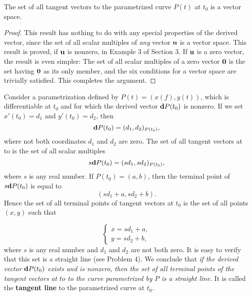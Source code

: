 

\begin{theorem} The set of all tangent vectors to the parametrized curve $P(t)$ at $t_0$ is a vector space.
\end{theorem}

\begin{proof}
This result has nothing to do with any special properties of the derived vector, since the set of all scalar multiples of \textit{any} vector $\mbox{\bf{u}}$ is a vector space. This result is proved, if $\mbox{\bf{u}}$ is nonzero, in Example 3 of Section 3. If $\mbox{\bf{u}}$ is a zero vector, the result is even simpler: The set of all scalar multiples of a zero vector $\mbox{\bf{0}}$ is the set having $\mbox{\bf{0}}$ as its only member, and the six conditions for a vector space are trivially satisfied. This completes the argument.
\end{proof}

Consider a parametrization defined by $P(t)= (x(f), y(t))$, which is differentiable at $t_0$ and for which the derived vector $\mbox{\bf{d}}P(t_0)$ is nonzero. If we set $x'(t_0) = d_1$ and $y'(t_0) = d_2$, then 
$$
\mbox{\bf{d}}P(t_0) = (d_1, d_2)_{P(t_0)},
$$
where not both coordinates $d_1$ and $d_2$ are zero. The set of all tangent vectors at to is the set of all scalar multiples 
$$
s\mbox{\bf{d}}P(t_0) = (sd_1, sd_2)_{P(t_0)},
$$
where $s$ is any real number. If $P(t_0) = (a, b)$, then the terminal point of $s\mbox{\bf{d}}P(t_0)$ is equal to
$$
(sd_1 + a, sd_2 + b).
$$
Hence the set of all terminal points of tangent vectors at $t_0$ is the set of all points $(x, y)$ such that 

\begin{equation}
\left \{ \begin{array}{l}
x = sd_1 + a,\\
y = sd_2 + b,
\end{array}
\right .
\label{eq10.4.4}
\end{equation}
where $s$ is any real number and $d_1$ and $d_2$ are not both zero. It is easy to verify that this set is a straight line (see Problem 4). We conclude that \textit{if the derived vector $\mbox{\bf{d}}P(t_0)$ exists and is nonzero, then the set of all terminal points of the tangent vectors at $to$ to the curve parametrized by $P$ is a straight line.}  It is called the \textbf{tangent line} to the parametrized curve at $t_0$.

